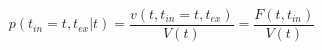 \begin{equation}
p(t_{in}=t,t_{ex}|t)  = \frac{v(t,t_{in}=t,t_{ex})}{V(t)}= \frac{F(t,t_{in})}{V(t)}
\end{equation}\begin{equation}

\end{equation}